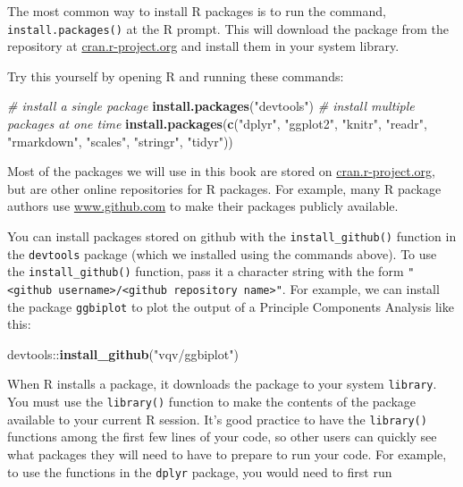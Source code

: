 \documentclass[]{book}
\newenvironment{Shaded}{\begin{snugshade}}{\end{snugshade}}
\newcommand{\KeywordTok}[1]{\textcolor[rgb]{0.13,0.29,0.53}{\textbf{{#1}}}}
\newcommand{\StringTok}[1]{\textcolor[rgb]{0.31,0.60,0.02}{{#1}}}
\newcommand{\CommentTok}[1]{\textcolor[rgb]{0.56,0.35,0.01}{\textit{{#1}}}}
\newcommand{\NormalTok}[1]{{#1}}
\begin{document}
The most common way to install R packages is to run the command,
\texttt{install.packages()} at the R prompt. This will download the
package from the repository at
\href{http://cran.r-project.org}{cran.r-project.org} and install them in
your system library.

Try this yourself by opening R and running these commands:

\begin{Shaded}
\begin{Highlighting}[]
\CommentTok{# install a single package}
\KeywordTok{install.packages}\NormalTok{(}\StringTok{"devtools"}\NormalTok{)}
\CommentTok{# install multiple packages at one time}
\KeywordTok{install.packages}\NormalTok{(}\KeywordTok{c}\NormalTok{(}\StringTok{"dplyr"}\NormalTok{, }\StringTok{"ggplot2"}\NormalTok{, }
                   \StringTok{"knitr"}\NormalTok{, }\StringTok{"readr"}\NormalTok{, }\StringTok{"rmarkdown"}\NormalTok{, }
                   \StringTok{"scales"}\NormalTok{, }\StringTok{"stringr"}\NormalTok{, }\StringTok{"tidyr"}\NormalTok{))}
\end{Highlighting}
\end{Shaded}

Most of the packages we will use in this book are stored on
\href{http://cran.r-project.org}{cran.r-project.org}, but are other
online repositories for R packages. For example, many R package authors
use \href{http://www.github.com}{www.github.com} to make their packages
publicly available.

You can install packages stored on github with the
\texttt{install\_github()} function in the \texttt{devtools} package
(which we installed using the commands above). To use the
\texttt{install\_github()} function, pass it a character string with the
form
\texttt{"\textless{}github\ username\textgreater{}/\textless{}github\ repository\ name\textgreater{}"}.
For example, we can install the package \texttt{ggbiplot} to plot the
output of a Principle Components Analysis like this:

\begin{Shaded}
\begin{Highlighting}[]
\NormalTok{devtools::}\KeywordTok{install_github}\NormalTok{(}\StringTok{"vqv/ggbiplot"}\NormalTok{)}
\end{Highlighting}
\end{Shaded}

When R installs a package, it downloads the package to your system
\texttt{library}. You must use the \texttt{library()} function to make
the contents of the package available to your current R session. It's
good practice to have the \texttt{library()} functions among the first
few lines of your code, so other users can quickly see what packages
they will need to have to prepare to run your code. For example, to use
the functions in the \texttt{dplyr} package, you would need to first run
\end{document}
